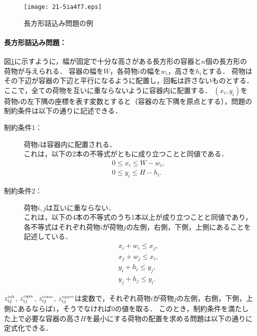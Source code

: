 \documentclass[japanese]{jnlp_1.4}
\begin{document}
\begin{figure}[b]
\begin{center}
\texttt{[image: 21-5ia4f7.eps]}
\end{center}
\caption{長方形詰込み問題の例}
\label{fig:packing}
\end{figure}


\paragraph{長方形詰込み問題：}
図\ref{fig:packing}に示すように，幅が固定で十分な高さがある長方形の容器と$n$個の長方形の荷物が与えられる．
容器の幅を$W$，各荷物$i$の幅を$w_i$，高さを$h_i$とする．
荷物はその下辺が容器の下辺と平行になるように配置し，回転は許さないものとする．
ここで，全ての荷物を互いに重ならないように容器内に配置する．
$(x_i,y_i)$を荷物$i$の左下隅の座標を表す変数とすると（容器の左下隅を原点とする），問題の制約条件は以下の通りに記述できる．
\begin{description}
\item [制約条件1：] 荷物$i$は容器内に配置される．\\
これは，以下の2本の不等式がともに成り立つことと同値である．
\begin{equation}
\begin{array}{l}
0 \le x_i \le W - w_i,\\
0 \le y_i \le H - h_i.
\end{array}
\end{equation}

\item [制約条件2：] 荷物$i,j$は互いに重ならない．\\
これは，以下の4本の不等式のうち1本以上が成り立つことと同値であり，各不等式はそれぞれ荷物$i$が荷物$j$の左側，右側，下側，上側にあることを記述している．
\begin{equation}
\begin{array}{l}
x_i + w_i \le x_j,\\
x_j + w_j \le x_i,\\
y_i + h_i \le y_j,\\
y_j + h_j \le y_i.
\end{array}
\end{equation}
\end{description}
$z_{ij}^{\textnormal{{\tiny left}}}$, $z_{ij}^{\textnormal{{\tiny right}}}$, $z_{ij}^{\textnormal{{\tiny lower}}}$, $z_{ij}^{\textnormal{{\tiny upper}}}$は変数で，それぞれ荷物$i$が荷物$j$の左側，右側，下側，上側にあるならば$1$，そうでなければ$0$の値を取る．
このとき，制約条件を満たした上で必要な容器の高さ$H$を最小にする荷物の配置を求める問題は以下の通りに定式化できる．
\end{document}
